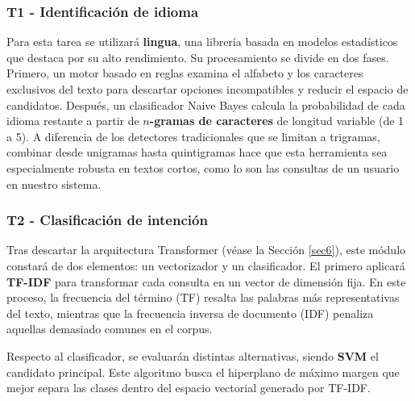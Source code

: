 \documentclass[11pt,a4paper,twoside]{article}
\theoremstyle{definition}
\numberwithin{equation}{section}
\begin{document}
\subsubsection*{T1 - Identificación de idioma}
Para esta tarea se utilizará \textbf{lingua}, una librería basada en modelos estadísticos que destaca por su alto rendimiento. Su procesamiento se divide en dos fases. Primero, un motor basado en reglas examina el alfabeto y los caracteres exclusivos del texto para descartar opciones incompatibles y reducir el espacio de candidatos. Después, un clasificador Naive Bayes calcula la probabilidad de cada idioma restante a partir de \textbf{$n$-gramas de caracteres} de longitud variable (de 1 a 5). A diferencia de los detectores tradicionales que se limitan a trigramas, combinar desde unigramas hasta quintigramas hace que esta herramienta sea especialmente robusta en textos cortos, como lo son las consultas de un usuario en nuestro sistema.

\subsubsection*{T2 - Clasificación de intención}
Tras descartar la arquitectura Transformer (véase la Sección \ref{sec6}), este módulo constará de dos elementos: un vectorizador y un clasificador. El primero aplicará \textbf{TF-IDF} para transformar cada consulta en un vector de dimensión fija. En este proceso, la frecuencia del término (TF) resalta las palabras más representativas del texto, mientras que la frecuencia inversa de documento (IDF) penaliza aquellas demasiado comunes en el corpus. 

Respecto al clasificador, se evaluarán distintas alternativas, siendo \textbf{SVM} el candidato principal. Este algoritmo busca el hiperplano de máximo margen que mejor separa las clases dentro del espacio vectorial generado por TF-IDF. 
\end{document}
